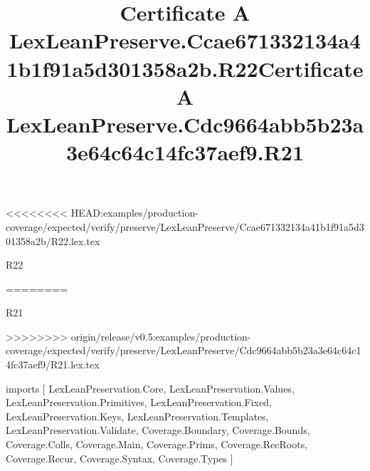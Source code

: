 <<<<<<<< HEAD:examples/production-coverage/expected/verify/preserve/LexLeanPreserve/Ccae671332134a41b1f91a5d301358a2b/R22.lex.tex
\begin{lexlean}{R22}
\title{Certificate A LexLeanPreserve.Ccae671332134a41b1f91a5d301358a2b.R22}
========
\begin{lexlean}{R21}
\title{Certificate A LexLeanPreserve.Cdc9664abb5b23a3e64c64c14fc37aef9.R21}
>>>>>>>> origin/release/v0.5:examples/production-coverage/expected/verify/preserve/LexLeanPreserve/Cdc9664abb5b23a3e64c64c14fc37aef9/R21.lex.tex
\begin{coremodule}
imports [
  LexLeanPreservation.Core,
  LexLeanPreservation.Values,
  LexLeanPreservation.Primitives,
  LexLeanPreservation.Fixed,
  LexLeanPreservation.Keys,
  LexLeanPreservation.Templates,
  LexLeanPreservation.Validate,
  Coverage.Boundary,
  Coverage.Bounds,
  Coverage.Colls,
  Coverage.Main,
  Coverage.Prims,
  Coverage.RecRoots,
  Coverage.Recur,
  Coverage.Syntax,
  Coverage.Types
]


\end{coremodule}
\end{lexlean}
\end{lexlean}
